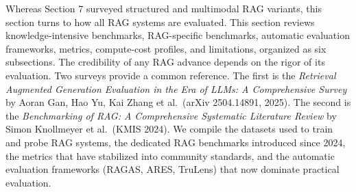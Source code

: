 \documentclass{article}
\begin{document}
Whereas Section 7 surveyed structured and multimodal RAG variants, this section turns to how all RAG systems are evaluated. This section reviews knowledge-intensive benchmarks, RAG-specific benchmarks, automatic evaluation frameworks, metrics, compute-cost profiles, and limitations, organized as six subsections. The credibility of any RAG advance depends on the rigor of its evaluation. Two surveys provide a common reference. The first is the \emph{Retrieval Augmented Generation Evaluation in the Era of LLMs: A Comprehensive Survey} by Aoran Gan, Hao Yu, Kai Zhang et al.~(arXiv 2504.14891, 2025). The second is the \emph{Benchmarking of RAG: A Comprehensive Systematic Literature Review} by Simon Knollmeyer et al.~(KMIS 2024). We compile the datasets used to train and probe RAG systems, the dedicated RAG benchmarks introduced since 2024, the metrics that have stabilized into community standards, and the automatic evaluation frameworks (RAGAS, ARES, TruLens) that now dominate practical evaluation.
\end{document}
